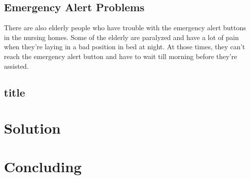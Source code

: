 \documentclass[14pt, a4paper]{extarticle}
\begin{document}
	\subsection{Emergency Alert Problems}
	There are also elderly people who have trouble with the emergency alert buttons in the nursing homes. Some of the elderly are paralyzed and have a lot of pain when they're laying in a bad position in bed at night. At those times, they can't reach the emergency alert button and have to wait till morning before they're assisted.
	
	\subsection{title}
	
	\newpage
	\section{Solution}
	
	\newpage
	\section{Concluding}
	
	\newpage
	
	
	
	
\end{document}
